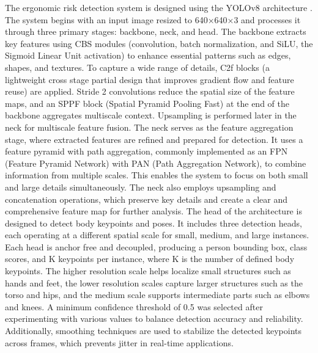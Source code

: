 \documentclass[11pt]{article}
\begin{document}
The ergonomic risk detection system is designed using the YOLOv8 architecture \citep{terven2023comprehensive}. The system begins with an input image resized to 640×640×3 and processes it through three primary stages: backbone, neck, and head. The backbone extracts key features using CBS modules (convolution, batch normalization, and SiLU, the Sigmoid Linear Unit activation) to enhance essential patterns such as edges, shapes, and textures. To capture a wide range of details, C2f blocks (a lightweight cross stage partial design that improves gradient flow and feature reuse) are applied. Stride 2 convolutions reduce the spatial size of the feature maps, and an SPPF block (Spatial Pyramid Pooling Fast) at the end of the backbone aggregates multiscale context. Upsampling is performed later in the neck for multiscale feature fusion. 
The neck serves as the feature aggregation stage, where extracted features are refined and prepared for detection. It uses a feature pyramid with path aggregation, commonly implemented as an FPN (Feature Pyramid Network) with PAN (Path Aggregation Network), to combine information from multiple scales. This enables the system to focus on both small and large details simultaneously. The neck also employs upsampling and concatenation operations, which preserve key details and create a clear and comprehensive feature map for further analysis. The head of the architecture is designed to detect body keypoints and poses. It includes three detection heads, each operating at a different spatial scale for small, medium, and large instances. Each head is anchor free and decoupled, producing a person bounding box, class scores, and K keypoints per instance, where K is the number of defined body keypoints. The higher resolution scale helps localize small structures such as hands and feet, the lower resolution scales capture larger structures such as the torso and hips, and the medium scale supports intermediate parts such as elbows and knees. A minimum confidence threshold of 0.5 was selected after experimenting with various values to balance detection accuracy and reliability. 
Additionally, smoothing techniques are used to stabilize the detected keypoints across frames, which prevents jitter in real-time applications.

\end{document}
